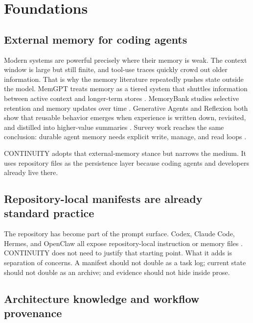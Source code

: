 
\section{Foundations}



\subsection{External memory for coding agents}



Modern \LLM{} systems are powerful precisely where their memory is weak. The context window is large but still finite, and tool-use traces quickly crowd out older information. That is why the memory literature repeatedly pushes state outside the model. MemGPT treats memory as a tiered system that shuttles information between active context and longer-term stores \cite{Packer2023MemGPT}. MemoryBank studies selective retention and memory updates over time \cite{Zhong2023MemoryBank}. Generative Agents and Reflexion both show that reusable behavior emerges when experience is written down, revisited, and distilled into higher-value summaries \cite{Park2023GenerativeAgents,Shinn2023Reflexion}. Survey work reaches the same conclusion: durable agent memory needs explicit write, manage, and read loops \cite{Wang2023LLMAgentSurvey}.

CONTINUITY adopts that external-memory stance but narrows the medium. It uses repository files as the persistence layer because coding agents and developers already live there.

\subsection{Repository-local manifests are already standard practice}

The repository has become part of the prompt surface. Codex, Claude Code, Hermes, and OpenClaw all expose repository-local instruction or memory files \cite{OpenAICodexAgents,AnthropicClaudeMemory,HermesContextFiles,OpenClawMemory}. CONTINUITY does not need to justify that starting point. What it adds is separation of concerns. A manifest should not double as a task log; current state should not double as an archive; and evidence should not hide inside prose.

\subsection{Architecture knowledge and workflow provenance}

